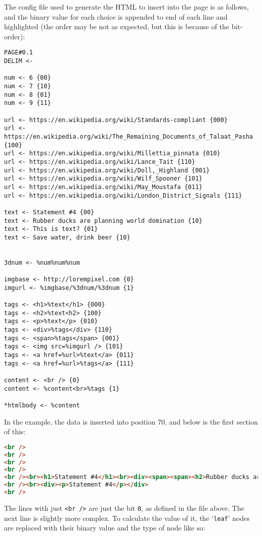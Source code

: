 The config file used to generate the HTML to insert into the page is as follows, and the binary value for each choice is appended to end of each line and highlighted (the order may be not as expected, but this is because of the bit-order):
\begin{lstlisting}[language=pagefile]
PAGE#0.1
DELIM <-

num <- 6 {00}
num <- 7 {10}
num <- 8 {01} 
num <- 9 {11}

url <- https://en.wikipedia.org/wiki/Standards-compliant {000}
url <- https://en.wikipedia.org/wiki/The_Remaining_Documents_of_Talaat_Pasha {100}
url <- https://en.wikipedia.org/wiki/Millettia_pinnata {010}
url <- https://en.wikipedia.org/wiki/Lance_Tait {110}
url <- https://en.wikipedia.org/wiki/Doll,_Highland {001}
url <- https://en.wikipedia.org/wiki/Wilf_Spooner {101}
url <- https://en.wikipedia.org/wiki/May_Moustafa {011}
url <- https://en.wikipedia.org/wiki/London_District_Signals {111}

text <- Statement #4 {00}
text <- Rubber ducks are planning world domination {10}
text <- This is text? {01}
text <- Save water, drink beer {10}


3dnum <- %num%num%num

imgbase <- http://lorempixel.com {0}
imgurl <- %imgbase/%3dnum/%3dnum {1}

tags <- <h1>%text</h1> {000}
tags <- <h2>%text<h2> {100}
tags <- <p>%text</p> {010}
tags <- <div>%tags</div> {110}
tags <- <span>%tags</span> {001}
tags <- <img src=%imgurl /> {101}
tags <- <a href=%url>%text</a> {011}
tags <- <a href=%url>%tags</a> {111}

content <- <br /> {0}
content <- %content<br>%tags {1}

*htmlbody <- %content
\end{lstlisting}
In the example, the data is inserted into position 70, and below is the first section of this:
\begin{lstlisting}[language=HTML,numbers=none]
<br />
<br />
<br />
<br />
<br /><br><h1>Statement #4</h1><br><div><span><span><h2>Rubber ducks are planning world domination<h2></span></span></div>
<br /><br><div><p>Statement #4</p></div>
<br />
\end{lstlisting}
The lines with just \texttt{<br />} are just the bit \texttt{0}, as defined in the file above.
The next line is slightly more complex.
To calculate the value of it, the `\texttt{leaf}' nodes are replaced with their binary value and the type of node like so:
\begin{lstlisting}[numbers=none]
%content:0%<br><h1>%text:00%</h1><br><div><span><span><h2>%text:10%<h2></span></span></div>
\end{lstlisting}
